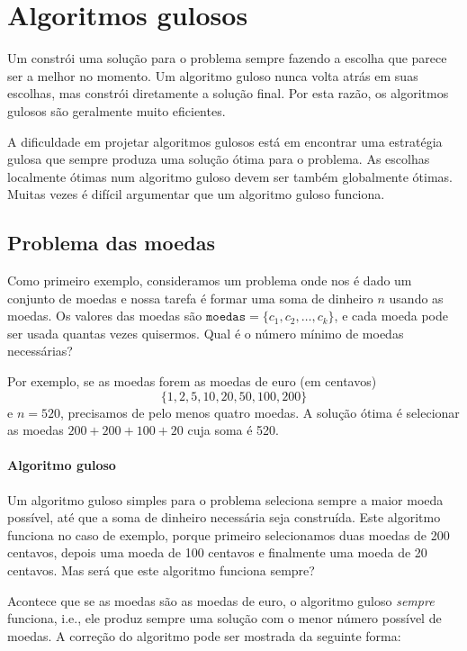 \chapter{Algoritmos gulosos}


Um 
constrói uma solução para o problema
sempre fazendo a escolha que parece
ser a melhor no momento.
Um algoritmo guloso nunca volta atrás
em suas escolhas, mas constrói diretamente
a solução final.
Por esta razão, os algoritmos gulosos
são geralmente muito eficientes.

A dificuldade em projetar algoritmos gulosos
está em encontrar uma estratégia gulosa
que sempre produza uma solução ótima
para o problema.
As escolhas localmente ótimas num algoritmo guloso
devem ser também globalmente ótimas.
Muitas vezes é difícil argumentar que
um algoritmo guloso funciona.

\section{Problema das moedas}

Como primeiro exemplo, consideramos um problema
onde nos é dado um conjunto de moedas
e nossa tarefa é formar uma soma de dinheiro $n$
usando as moedas.
Os valores das moedas são
$\texttt{moedas}=\{c_1,c_2,\ldots,c_k\}$,
e cada moeda pode ser usada quantas vezes quisermos.
Qual é o número mínimo de moedas necessárias?

Por exemplo, se as moedas forem as moedas de euro (em centavos)
\[\{1,2,5,10,20,50,100,200\}\]
e $n=520$,
precisamos de pelo menos quatro moedas.
A solução ótima é selecionar as moedas
$200+200+100+20$ cuja soma é 520.

\subsubsection{Algoritmo guloso}

Um algoritmo guloso simples para o problema
seleciona sempre a maior moeda possível,
até que a soma de dinheiro necessária seja construída.
Este algoritmo funciona no caso de exemplo,
porque primeiro selecionamos duas moedas de 200 centavos,
depois uma moeda de 100 centavos e finalmente uma moeda de 20 centavos.
Mas será que este algoritmo funciona sempre?

Acontece que se as moedas são as moedas de euro,
o algoritmo guloso \emph{sempre} funciona, i.e.,
ele produz sempre uma solução com o menor número
possível de moedas.
A correção do algoritmo pode ser
mostrada da seguinte forma:

